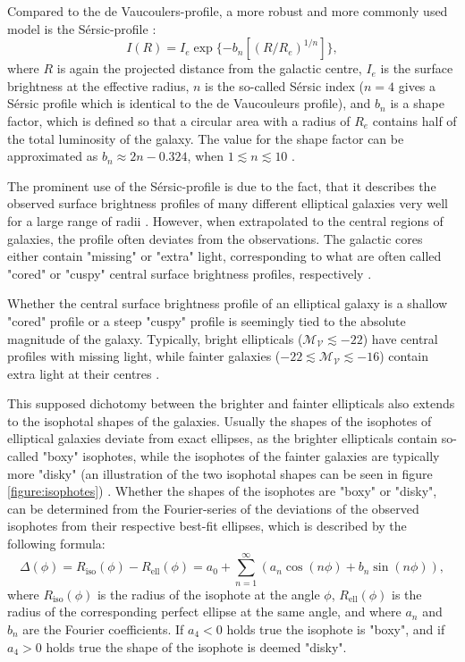 \documentclass[english, twoside]{HYgradu}
\begin{document}
Compared to the de Vaucoulers-profile, a more robust and more commonly used model is the Sérsic-profile \citep{Sersic1968}:
\begin{equation}
I (R) = I_e \exp \{ -b_n \left[ (R / R_e)^{1/n} \right] \},
\end{equation}
where $R$ is again the projected distance from the galactic centre, $I_e$ is the surface brightness at the effective radius, $n$ is the so-called Sérsic index ($n=4$ gives a Sérsic profile which is identical to the de Vaucouleurs profile), and $b_n$ is a shape factor, which is defined so that a circular area with a radius of $R_e$ contains half of the total luminosity of the galaxy. The value for the shape factor can be approximated as $b_n \approx 2n - 0.324$, when $1 \lesssim n \lesssim 10$ \citep{BinneyTremaine}. 

The prominent use of the Sérsic-profile is due to the fact, that it describes the observed surface brightness profiles of many different elliptical galaxies very well for a large range of radii \citep{MerrittBook}. However, when extrapolated to the central regions of galaxies, the profile often deviates from the observations. The galactic cores either contain "missing" or "extra" light, corresponding to what are often called "cored" or "cuspy" central surface brightness profiles, respectively \citep[e.g.][]{Kormendy2009}.

Whether the central surface brightness profile of an elliptical galaxy is a shallow "cored" profile or a steep "cuspy" profile is seemingly tied to the absolute magnitude of the galaxy. Typically, bright ellipticals ($\mathcal{M_V} \lesssim -22$) have central profiles with missing light, while fainter galaxies ($-22 \lesssim \mathcal{M_V} \lesssim -16$) contain extra light at their centres \citep{Kormendy2009}. 

This supposed dichotomy between the brighter and fainter ellipticals also extends to the isophotal shapes of the galaxies. Usually the shapes of the isophotes of elliptical galaxies deviate from exact ellipses, as the brighter ellipticals contain so-called "boxy" isophotes, while the isophotes of the fainter galaxies are typically more "disky" (an illustration of the two isophotal shapes can be seen in figure \ref{figure:isophotes}) \citep{GalaxyFormationAndEvo2010}. Whether the shapes of the isophotes are "boxy" or "disky", can be determined from the Fourier-series of the deviations of the observed isophotes from their respective best-fit ellipses, which is described by the following formula:
\begin{equation}
\Delta (\phi) = R_\mathrm{iso}(\phi) - R_\mathrm{ell}(\phi) = a_0 + \displaystyle\sum^\infty_{n=1} (a_n \cos(n\phi) + b_n \sin(n\phi)), \label{eq:isophote_deviations}
\end{equation}
where $R_\mathrm{iso}(\phi)$ is the radius of the isophote at the angle $\phi$, $R_\mathrm{ell}(\phi)$ is the radius of the corresponding perfect ellipse at the same angle, and where $a_n$ and $b_n$ are the Fourier coefficients. If $a_4 < 0$ holds true the isophote is "boxy", and if $a_4 > 0$ holds true the shape of the isophote is deemed "disky".
\end{document}
